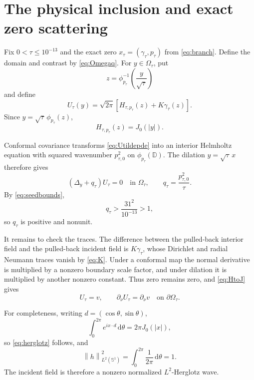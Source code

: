 \documentclass[11pt]{amsart}
\newcommand{\D}{\mathbb D}
\newcommand{\Sone}{\mathbb S^1}
\newcommand{\norm}[1]{\left\lVert #1\right\rVert}
\newcommand{\abs}[1]{\left\lvert #1\right\rvert}
\newcommand{\dd}{\,\mathrm d}
\begin{document}
\section{The physical inclusion and exact zero scattering}\label{sec:physical}

Fix $0<\tau\le10^{-13}$ and the exact zero
$x_\tau=(\gamma_\tau,p_\tau)$ from \eqref{eq:branch}.  Define the domain and
contrast by \eqref{eq:Omegaq}.  For $y\in\Omega_\tau$, put
\[
  z=\phi_{p_\tau}^{-1}\!\left(\frac y{\sqrt\tau}\right)
\]
and define
\begin{equation}\label{eq:U}
  U_\tau(y)
  =\sqrt{2\pi}\left[
    H_{\tau,p_\tau}(z)+K\gamma_\tau(z)
  \right].
\end{equation}
Since $y=\sqrt\tau\,\phi_{p_\tau}(z)$,
\begin{equation}\label{eq:HtoJ}
  H_{\tau,p_\tau}(z)=J_0(\abs y).
\end{equation}

Conformal covariance transforms \eqref{eq:Utildepde} into an interior
Helmholtz equation with squared wavenumber $p_{\tau,0}^2$ on
$\phi_{p_\tau}(\D)$.  The dilation $y=\sqrt\tau\,x$ therefore gives
\begin{equation}\label{eq:Upde}
  (\Delta_y+q_\tau)U_\tau=0
  \quad\text{in }\Omega_\tau,
  \qquad
  q_\tau=\frac{p_{\tau,0}^2}{\tau}.
\end{equation}
By \eqref{eq:seedbounds},
\begin{equation}\label{eq:qnot1}
  q_\tau>\frac{31^2}{10^{-13}}>1,
\end{equation}
so $q_\tau$ is positive and nonunit.

It remains to check the traces.  The difference between the pulled-back
interior field and the pulled-back incident field is $K\gamma_\tau$, whose
Dirichlet and radial Neumann traces vanish by \eqref{eq:K}.  Under a
conformal map the normal derivative is multiplied by a nonzero boundary
scale factor, and under dilation it is multiplied by another nonzero
constant.  Thus zero remains zero, and \eqref{eq:HtoJ} gives
\begin{equation}\label{eq:physicaltraces}
  U_\tau=v,
  \qquad
  \partial_\nu U_\tau=\partial_\nu v
  \quad\text{on }\partial\Omega_\tau.
\end{equation}

For completeness, writing $d=(\cos\theta,\sin\theta)$,
\[
  \int_0^{2\pi}e^{ix\cdot d}\dd\theta
  =2\pi J_0(\abs x),
\]
so \eqref{eq:herglotz} follows, and
\[
  \norm h_{L^2(\Sone)}^2
  =\int_0^{2\pi}\frac1{2\pi}\dd\theta=1.
\]
The incident field is therefore a nonzero normalized $L^2$-Herglotz wave.
\end{document}
